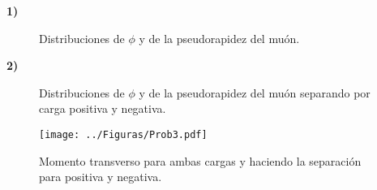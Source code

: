 \documentclass[11pt]{article}
\begin{document}
\textbf{1)}
\begin{figure}[H]
\centering
{}

\caption{Distribuciones de $\phi$ y de la pseudorapidez del muón.}
\label{fig:Prob1A}
\end{figure}

\textbf{2)}
\begin{figure}[H]
\centering
{}

\caption{Distribuciones de $\phi$ y de la pseudorapidez del muón separando por carga positiva y negativa.}
\label{fig:Prob2}
\end{figure}

\begin{figure}[H]
\centering
\texttt{[image: ../Figuras/Prob3.pdf]}
\caption{Momento transverso para ambas cargas y haciendo la separación para positiva y negativa.}
\label{fig:Prob3}
\end{figure}
\end{document}

